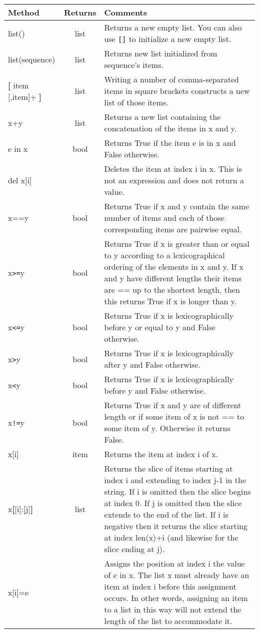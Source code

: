 \begin{center}
{\small
\begin{tabular}{|l|c|p{3in}|} \hline
{\bf Method} & {\bf Returns} & {\bf Comments} \\ \hline\hline 
list() & list & Returns a new empty list. You can also use \verb+[]+ to initialize a new empty list. \\ \hline
   list(sequence) & list & Returns new list initialized from sequence's items. \\ \hline
   {\bf [} item [,item]+ {\bf ]} & list & Writing a number of comma-separated items in square brackets constructs a new list of those items.\\ \hline
x+y & list & Returns a new list containing the concatenation of the items in x and y. \\ \hline  
e in x & bool & Returns True if the item e is in x and False otherwise.\\ \hline  
del x[i] & & Deletes the item at index i in x. This is not an expression and does not return a value. \\ \hline  
x==y &  bool & Returns True if x and y contain the same number of items and each of those corresponding items are pairwise equal.\\ \hline  
x\verb+>=+y & bool &  Returns True if x is greater than or equal to y according to a lexicographical ordering of the elements in x and y. If x and y have different lengths their items are == up to the shortest length, then this returns True if x is longer than y. \\ \hline 
x\verb+<=+y & bool & Returns True if x is lexicographically before y or equal to y and False otherwise. \\ \hline 
x\verb+>+y & bool & Returns True if x is lexicographically after y and False otherwise. \\ \hline  
x\verb+<+y & bool & Returns True if x is lexicographically before y and False otherwise.\\ \hline 
x\verb+!=+y & bool & Returns True if x and y are of different length or if some item of x is not == to some item of y. Otherwise it returns False.\\ \hline 
x[i] & item & Returns the item at index i of x.\\ \hline  
x{\bf [}[i]:[j]{\bf ]} & list &
Returns the slice of items starting at index i and extending to index j-1 in the  string. If i is omitted then the
slice begins at  index 0. If j is omitted then the slice extends  to the end of the list.  If i  is negative then it returns the slice starting at index len(x)+i (and likewise for the slice ending at j). 
\\ \hline
x[i]=e & & Assigns the position at index i the value of e in x. The list x must already have an item at index i before this assignment occurs. In other words, assigning an item to a list in this way will not extend the length of the list to accommodate it. \\ \hline     

\end{tabular}}
\end{center}

